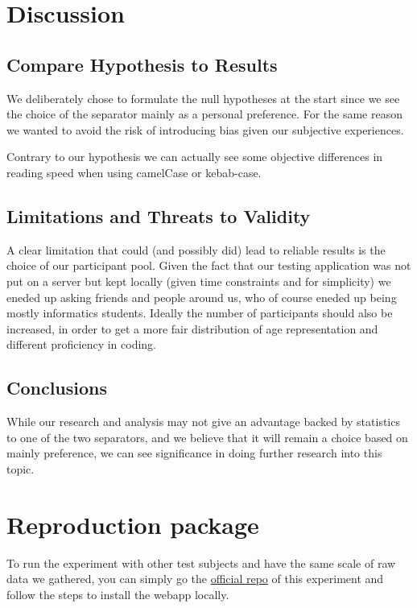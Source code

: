 \documentclass{article}
\begin{document}
\section{Discussion}

\subsection{Compare Hypothesis to Results}
We deliberately chose to formulate the null hypotheses at the start since we see the choice of the separator mainly as a personal preference. For the same reason 
we wanted to avoid the risk of introducing bias given our subjective experiences.

Contrary to our hypothesis we can actually see some objective differences in reading speed when using camelCase or kebab-case.

\subsection{Limitations and Threats to Validity}
A clear limitation that could (and possibly did) lead to reliable results is the choice of our participant pool. Given the fact that our testing application 
was not put on a server but kept locally (given time constraints and for simplicity) we eneded up asking friends and people around us, who of course eneded up being 
mostly informatics students. Ideally the number of participants should also be increased, in order to get a more fair distribution of age representation and different 
proficiency in coding.

\subsection{Conclusions}
While our research and analysis may not give an advantage backed by statistics to one of the two separators, and we believe that it will remain a choice based on mainly 
preference, we can see significance in doing further research into this topic.


\newpage

\appendix
\section{Reproduction package}
To run the experiment with other test subjects and have the same scale of raw
data we gathered, you can simply go the
\href{https://github.com/karma-riuk/camel-kebab}{official repo} of this
experiment and follow the steps to install the webapp locally.
\end{document}
